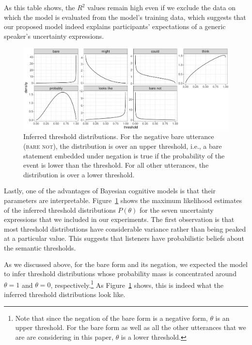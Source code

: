 \documentclass[man, floatsintext]{apa6}
\begin{document}
As this table shows, the $R^2$ values remain high even if we exclude the data on which the model is evaluated from the model's training data, 
which suggests that our proposed model indeed explains
participants' expectations of a generic speaker's uncertainty expressions. 

\begin{figure}[th!]
\includegraphics[width=\textwidth]{plots/threshold-distributions-prior.pdf}
\caption{Inferred threshold distributions. For the negative bare utterance (\textsc{bare not}), the distribution is over an upper threshold, i.e., a bare statement embedded under negation is true if the probability of the event is lower than the threshold. For all other utterances, the distribution is over a lower threshold.
\label{fig:threshold-distributions}}
\end{figure}

Lastly, one of the advantages of Bayesian cognitive models is that their parameters are interpretable. Figure~\ref{fig:threshold-distributions} shows the 
maximum likelihood estimates of the inferred threshold distributions $P(\theta)$ for the seven uncertainty expressions that we included in our experiments.
The first observation is that most threshold distributions have considerable variance rather than being peaked at a particular value. This suggests that
listeners have probabilistic beliefs about the semantic thresholds.

As we discussed above, for the bare form and its negation, we expected the model to infer threshold distributions whose probability mass is concentrated 
around $\theta=1$ and $\theta=0$, respectively.\footnote{Note that since the negation of the bare form is a negative form, $\theta$ is an upper threshold. For the bare form as well as
all the other utterances that we are are considering in this paper, $\theta$ is a lower threshold.} As  Figure~\ref{fig:threshold-distributions} shows, this is indeed what
the inferred threshold distributions look like. 
\end{document}
